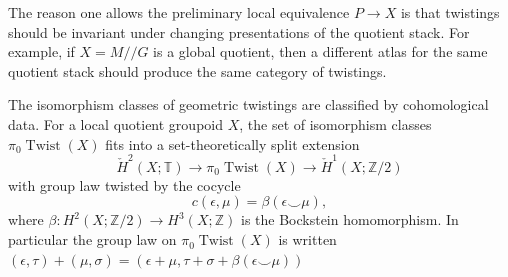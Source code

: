 \documentclass[12pt]{article}
\begin{document}
The reason one allows the preliminary local equivalence $P\to X$ is that twistings should be invariant under changing presentations of the quotient stack. For example, if $X=M//G$ is a global quotient, then a different atlas for the same quotient stack should produce the same category of twistings.

The isomorphism classes of geometric twistings are classified by cohomological data.
For a local quotient groupoid $X$, the set of isomorphism classes $\pi_0\operatorname{Twist}(X)$ fits into a set-theoretically split extension
\[
    \check H^2(X;\mathbb T)
    \longrightarrow
    \pi_0\operatorname{Twist}(X)
    \longrightarrow
    \check H^1(X;\mathbb Z/2)
\]
with group law twisted by the cocycle
\[
    c(\epsilon,\mu)=\beta(\epsilon\smile\mu),
\]
where $\beta:H^2(X;\mathbb Z/2)\to H^3(X;\mathbb Z)$ is the Bockstein homomorphism. In particular the group law on $\pi_0\operatorname{Twist}(X)$ is written
$(\epsilon,\tau)+(\mu,\sigma) = (\epsilon+\mu,\tau+\sigma+\beta(\epsilon\smile\mu))$
\end{document}
